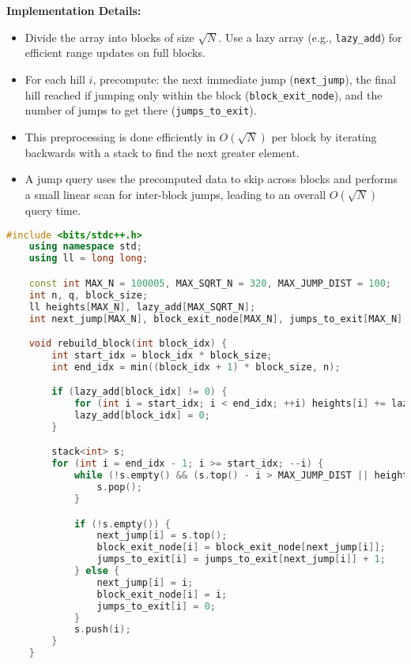 \documentclass[10pt]{article}
\begin{document}
\begin{itemize}
{    \textbf{Implementation Details:}
    \begin{itemize}
        \item Divide the array into blocks of size $\sqrt{N}$. Use a lazy array (e.g., \texttt{lazy\_add}) for efficient range updates on full blocks.
        \item For each hill $i$, precompute: the next immediate jump (\texttt{next\_jump}), the final hill reached if jumping only within the block (\texttt{block\_exit\_node}), and the number of jumps to get there (\texttt{jumps\_to\_exit}).
        \item This preprocessing is done efficiently in $O(\sqrt{N})$ per block by iterating backwards with a stack to find the next greater element.
        \item A jump query uses the precomputed data to skip across blocks and performs a small linear scan for inter-block jumps, leading to an overall $O(\sqrt{N})$ query time.
    \end{itemize}
    \begin{lstlisting}[language=C++, basicstyle=\ttfamily\fontsize{7pt}{8pt}\selectfont]
    #include <bits/stdc++.h>
    using namespace std;
    using ll = long long;

    const int MAX_N = 100005, MAX_SQRT_N = 320, MAX_JUMP_DIST = 100;
    int n, q, block_size;
    ll heights[MAX_N], lazy_add[MAX_SQRT_N];
    int next_jump[MAX_N], block_exit_node[MAX_N], jumps_to_exit[MAX_N];

    void rebuild_block(int block_idx) {
        int start_idx = block_idx * block_size;
        int end_idx = min((block_idx + 1) * block_size, n);

        if (lazy_add[block_idx] != 0) {
            for (int i = start_idx; i < end_idx; ++i) heights[i] += lazy_add[block_idx];
            lazy_add[block_idx] = 0;
        }

        stack<int> s;
        for (int i = end_idx - 1; i >= start_idx; --i) {
            while (!s.empty() && (s.top() - i > MAX_JUMP_DIST || heights[s.top()] <= heights[i])) {
                s.pop();
            }

            if (!s.empty()) {
                next_jump[i] = s.top();
                block_exit_node[i] = block_exit_node[next_jump[i]];
                jumps_to_exit[i] = jumps_to_exit[next_jump[i]] + 1;
            } else {
                next_jump[i] = i;
                block_exit_node[i] = i;
                jumps_to_exit[i] = 0;
            }
            s.push(i);
        }
    }


\end{lstlisting}}
\end{itemize}
\end{document}

